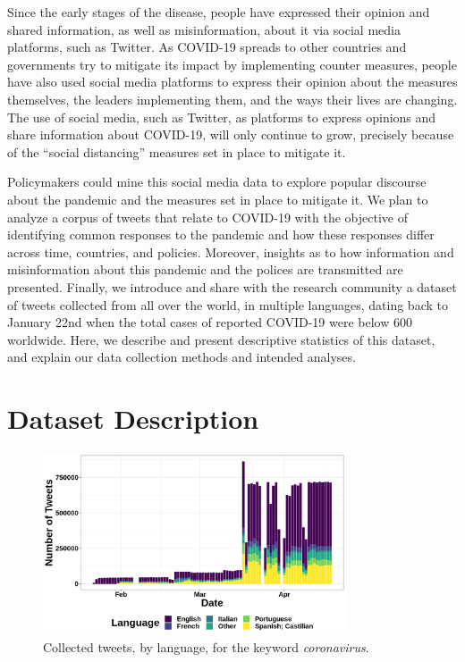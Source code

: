 \documentclass{article}
\begin{document}
Since the early stages of the disease, people have expressed their opinion and shared information, as well as misinformation, about it via social media platforms, such as Twitter. As COVID-19 spreads to other countries and governments try to mitigate its impact by implementing counter measures, people have also used social media platforms to express their opinion about the measures themselves, the leaders implementing them, and the ways their lives are changing. The use of social media, such as Twitter, as platforms to express opinions and share information about COVID-19, will only continue to grow, precisely because of the “social distancing” measures set in place to mitigate it.

Policymakers could mine this social media data to explore popular discourse about the pandemic and the measures set in place to mitigate it. We plan to analyze a corpus of tweets that relate to COVID-19 with the objective of identifying common responses to the pandemic and how these responses differ across time, countries, and policies. Moreover, insights as to how information and misinformation about this pandemic and the polices are transmitted are presented. Finally, we introduce and share with the research community a dataset of tweets collected from all over the world, in multiple languages, dating back to January 22nd when the total cases of reported COVID-19 were below 600 worldwide. Here, we describe and present descriptive statistics of this dataset, and explain our data collection
methods and intended analyses.

\section{Dataset Description}


\begin{figure}[!b]
    \centering
    \includegraphics[width=0.8\textwidth]{images/language_coronavirus.png}
    \caption{Collected tweets, by language, for the keyword \textit{coronavirus}.}
    \label{fig:language-coronavirus}
\end{figure}
\end{document}
